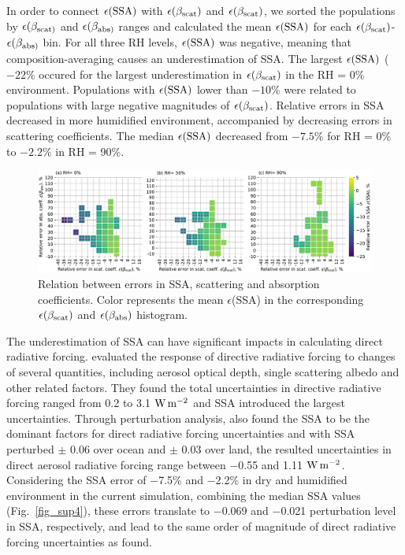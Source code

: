 \documentclass[edeposit,fullpage]{uiucthesis2009}
\makeatletter
\DeclareRobustCommand*\unit[1]
 {\ensuremath{%
   {\thinmuskip3mu\relax
    \def\mu{\text{\textmu}}\def~{\,}%
    \ifx\f@series\testbx\mathbf{#1}\else\mathrm{#1}\fi}}}
\makeatother
\begin{document}
In order to connect $\epsilon(\rm SSA)$ with $\epsilon(\beta_{\rm
  scat})$ and $\epsilon(\beta_{\rm scat})$, we sorted the populations
by $\epsilon(\beta_{\rm scat)}$ and $\epsilon(\beta_{\rm abs)}$ ranges
and calculated the mean $\epsilon(\rm SSA)$ for each
$\epsilon(\beta_{\rm scat})$-$\epsilon(\beta_{\rm abs)}$ bin. For all
three RH levels, $\epsilon(\rm SSA)$ was negative, meaning that
composition-averaging causes an underestimation of SSA. The largest
$\epsilon(\rm SSA)$ ($-22$\% occured for the largest underestimation
in $\epsilon(\beta_{\rm scat})$ in the RH = 0\%
environment. Populations with $\epsilon(\rm SSA)$ lower than $-10$\%
were related to populations with large negative magnitudes of
$\epsilon(\beta_{\rm scat})$. Relative errors in SSA decreased in more
humidified environment, accompanied by decreasing errors in scattering
coefficients. The median $\epsilon(\rm SSA)$ decreased from $-7.5$\%
for RH = 0\% to $-2.2$\% in RH = 90\%.

\begin{figure}
	\centering
	\includegraphics[scale=0.50]{chap4_figs/fig10.pdf}
	\caption{Relation between errors in SSA, scattering and
          absorption coefficients. Color represents the mean
          $\epsilon$(SSA) in the corresponding $\epsilon(\beta_{\rm
            scat})$ and $\epsilon(\beta_{\rm \rm abs})$ histogram.}
	\label{fig12:ssa-err}
\end{figure}

The underestimation of SSA can have significant impacts in calculating
direct radiative forcing. \citet{mccomiskey2008direct} evaluated the
response of directive radiative forcing to changes of several
quantities, including aerosol optical depth, single
scattering albedo and other related factors. They found the total
uncertainties in directive radiative forcing ranged from 0.2 to 3.1
\unit{W\,m^{-2}} and SSA introduced the largest uncertainties. Through
perturbation analysis, \citet{loeb2010direct} also found the SSA to be
the dominant factors for direct radiative forcing uncertainties and
with SSA perturbed $\pm$ 0.06 over ocean and $\pm$ 0.03 over land, the
resulted uncertainties in direct aerosol radiative forcing range
between $-$0.55 and 1.11 \unit{W\,m^{-2}}. Considering the SSA error of
$-$7.5\% and $-$2.2\% in dry and humidified environment in the current
simulation, combining the median SSA values (Fig.~\ref{fig_sup4}), these errors
translate to $-$0.069 and $-$0.021 perturbation level in SSA,
respectively, and lead to the same order of magnitude of direct
radiative forcing uncertainties as \citeauthor{loeb2010direct} found.
\end{document}
